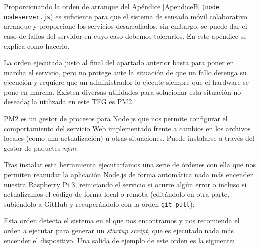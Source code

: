 \begin{appendices}
\begin{center}
\begin{minipage}{.75\textwidth}
Proporcionando la orden de arranque del Apéndice \ref{ApendiceB} (\texttt{node nodeserver.js}) es suficiente para que el sistema de sensado móvil colaborativo arranque y proporcione los servicios desarrollados. sin embargo, se puede dar el caso de fallos del servidor en cuyo caso debemos tolerarlos. En este apéndice se explica como hacerlo.
\end{minipage}
\end{center}
\clearpage%

La orden ejecutada justo al final del apartado anterior basta para poner en marcha el servicio, pero no protege ante la situación de que un fallo detenga su ejecución y requiere que un administrador lo ejecute siempre que el hardware se pone en marcha. Existen diversas utilidades para solucionar esta situación no deseada; la utilizada en este TFG es PM2.

PM2 es un gestor de procesos para Node.js que nos permite configurar el comportamiento del servicio Web implementado frente a cambios en los archivos locales (como una actualización) u otras situaciones. Puede instalarse a través del gestor de paquetes \emph{npm}:


Tras instalar esta herramienta ejecutaríamos una serie de órdenes con ella que nos permiten reanudar la aplicación Node.js de forma automática nada más encender nuestra Raspberry Pi 3, reiniciando el servicio si ocurre algún error o incluso si actualizamos el código de forma local o remota (editándolo en otra parte, subiéndolo a GitHub y recuperándolo con la orden \texttt{git pull}): 


Esta orden detecta el sistema en el que nos encontramos y nos recomienda el orden a ejecutar para generar un \emph{startup script}, que es ejecutado nada más encender el dispositivo. Una salida de ejemplo de este orden es la siguiente:



\end{appendices}

